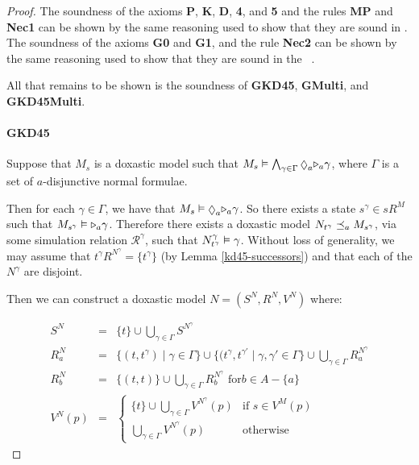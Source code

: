 \begin{proof}
The soundness of the axioms {\bf P}, {\bf K}, {\bf D}, {\bf 4}, and {\bf 5} and the
rules {\bf MP} and {\bf Nec1} can be shown by the same reasoning used to show
that they are sound in \logicKD{}. The soundness of the axioms {\bf G0} and {\bf
G1}, and the rule {\bf Nec2} can be shown by the same reasoning used to show
that they are sound in the \logicKiF{}~\cite{french2010future}.

All that remains to be shown is the soundness of {\bf GKD45}, {\bf GMulti}, and
{\bf GKD45Multi}.

\paragraph{GKD45}
Suppose that $M_s$ is a doxastic model such that $M_s \entails \bigwedge_{\gamma
\in \Gamma} \suspects_a \somerefs_a \gamma$, where $\Gamma$ is a set of
$a$-disjunctive normal formulae.

Then for each $\gamma \in \Gamma$, we have that $M_s \entails \suspects_a
\somerefs_a \gamma$. So there exists a state $s^\gamma \in sR^M$ such
that $M_{s^\gamma} \vDash {\ensuremath{\mathopen{\triangleright}}}_a \gamma$. Therefore there exists a
doxastic model $N_{t^\gamma} \preceq_a M_{s^\gamma}$, via some simulation
relation $\mathcal{R}^\gamma$, such that $N^\gamma_{t^\gamma} \vDash \gamma$.
Without loss of generality, we may assume that $t^\gamma R^{N^\gamma} =
\{t^\gamma\}$ (by Lemma \ref{kd45-successors}) and that each of the $N^\gamma$
are disjoint.

Then we can construct a doxastic model $N = (S^N, R^N, V^N)$ where:

\begin{eqnarray*}
S^N &=& \{t\} \cup \bigcup_{\gamma \in \Gamma} S^{N^\gamma}\\
R^N_a &=& \{(t, t^\gamma) \mid \gamma \in \Gamma\} \cup \{(t^\gamma,
t^{\gamma'} \mid \gamma, \gamma' \in \Gamma\} \cup \bigcup_{\gamma \in
\Gamma} R^{N^\gamma}_a\\
R^N_b &=& \{(t, t)\} \cup \bigcup_{\gamma \in \Gamma} R^{N^\gamma}_b \text{ for
$b \in A - \{a\}$}\\
V^N(p) &=& \begin{cases}
\{t\} \cup \bigcup_{\gamma \in \Gamma} V^{N^\gamma}(p) & \text{if $s \in
V^M(p)$}\\
\bigcup_{\gamma \in \Gamma} V^{N^\gamma}(p) & \text{otherwise}
\end{cases}
\end{eqnarray*}


\end{proof}
